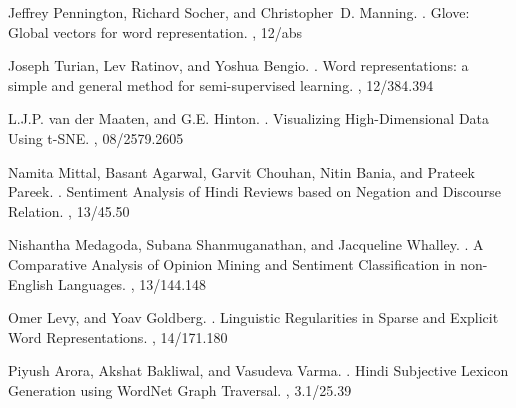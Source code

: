 \def\DevnagVersion{2.15}\documentclass[11pt]{article}
\begin{document}
\begin{thebibliography}{40}
Jeffrey Pennington, Richard Socher, and Christopher~D. Manning.
.
\newblock Glove: Global vectors for word representation.
,
   12/abs

Joseph Turian, Lev Ratinov, and Yoshua Bengio.
.
\newblock Word representations: a simple and general method for semi-supervised learning.
,
   12/384.394

L.J.P. van der Maaten, and G.E. Hinton.
.
\newblock Visualizing High-Dimensional Data Using t-SNE.
,
   08/2579.2605

Namita Mittal, Basant Agarwal, Garvit Chouhan, Nitin Bania, and Prateek Pareek.
.
\newblock Sentiment Analysis of Hindi Reviews based on Negation and Discourse Relation.
,
   13/45.50
   
Nishantha Medagoda, Subana Shanmuganathan, and Jacqueline Whalley.
.
\newblock A Comparative Analysis of Opinion Mining and Sentiment Classification in non-English Languages.
,
   13/144.148


Omer Levy, and Yoav Goldberg.
.
\newblock Linguistic Regularities in Sparse and Explicit Word Representations.
,
   14/171.180

Piyush Arora, Akshat Bakliwal, and Vasudeva Varma.
.
\newblock Hindi Subjective Lexicon Generation using WordNet Graph Traversal.
,
   3.1/25.39


\end{thebibliography}
\end{document}
